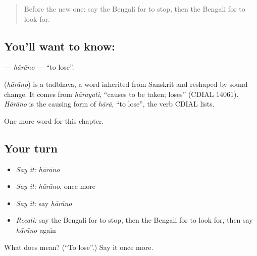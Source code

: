 \label{lesson:BN-C52-harano}



\begin{quote}
Before the new one: say the Bengali for to stop, then the Bengali for to look for.
\end{quote}

\subsection*{You'll want to know: }
\textbf{} — \emph{hārāno} — \textquotedblleft{}to lose\textquotedblright{}.

\begin{cousinweb}
\textbf{} (\emph{hārāno}) is a tadbhava, a word inherited from Sanskrit and reshaped by sound change. It comes from \emph{hārayati}, \textquotedblleft{}causes to be taken; loses\textquotedblright{} (CDIAL 14061). \emph{Hārāno} is the causing form of \emph{hārā}, \textquotedblleft{}to lose\textquotedblright{}, the verb CDIAL lists.
\end{cousinweb}

\begin{grammarlens}[title={What you've built}]
One more word for this chapter.
\end{grammarlens}

\subsection*{Your turn}
\begin{itemize}
\raggedright
  \item \emph{Say it:} \emph{hārāno}
  \item \emph{Say it:} \emph{hārāno}, once more
  \item \emph{Say it:} say \emph{hārāno}
  \item \emph{Recall:} say the Bengali for to stop, then the Bengali for to look for, then say \emph{hārāno} again
\end{itemize}

\begin{tcolorbox}[breakable,colback=teal!4,colframe=teal!35!black,title={Before you move on}]
What does  mean? (\textquotedblleft{}To lose\textquotedblright{}.) Say it once more.
\end{tcolorbox}
